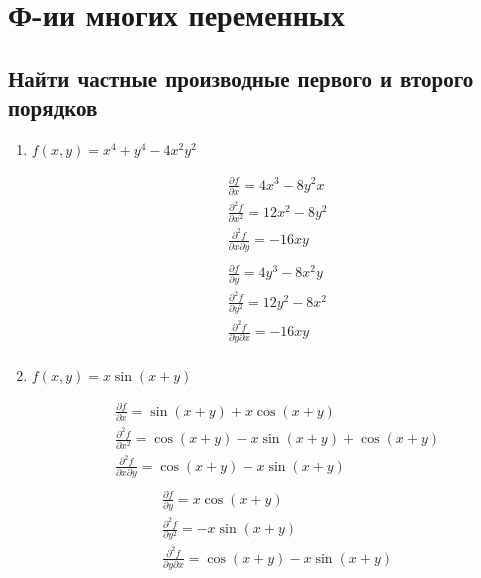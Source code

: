 \section{Ф-ии многих переменных}
\subsection{Найти частные производные первого и второго порядков}
\begin{enumerate}
  \item %
$f(x, y) = x^4 + y^4 - 4x^2y^2$ \\
\begin{paracol}{2}
\begin{align*}
  &\frac{\partial f}{\partial x} = 4x^3 - 8y^2x \\
  &\frac{\partial^2 f}{\partial x^2} = 12x^2 - 8y^2 \\
  &\frac{\partial^2 f}{\partial x \partial y} = - 16xy \\
\end{align*}
\switchcolumn%
\begin{align*}
  &\frac{\partial f}{\partial y} = 4y^3 - 8x^2y \\
  &\frac{\partial^2 f}{\partial y^2} = 12y^2 - 8x^2 \\
  &\frac{\partial^2 f}{\partial y \partial x} = - 16xy \\
\end{align*}
\end{paracol}

  \item %
$f(x, y) = x\sin(x + y)$ \\
\begin{paracol}{2}
\begin{align*}
  &\frac{\partial f}{\partial x} = \sin(x+y) + x\cos(x+y) \\
  &\frac{\partial^2 f}{\partial x^2} = \cos(x+y) - x\sin(x+y) + \cos(x+y) \\
  &\frac{\partial^2 f}{\partial x \partial y} = \cos(x+y) - x\sin(x+y) \\
\end{align*}
\switchcolumn%
\begin{align*}
  &\frac{\partial f}{\partial y} = x\cos(x+y) \\
  &\frac{\partial^2 f}{\partial y^2} = -x\sin(x+y) \\
  &\frac{\partial^2 f}{\partial y \partial x} = \cos(x+y) - x\sin(x+y) \\
\end{align*}
\end{paracol}


\end{enumerate}

